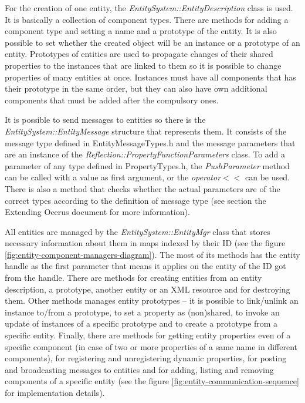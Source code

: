 \documentclass[a4paper, 12pt]{report}
\begin{document}
For the creation of one entity, the \emph{EntitySystem::EntityDescription} class is used. It is basically a collection of component types. There are methods for adding a component type and setting a name and a prototype of the entity. It is also possible to set whether the created object will be an instance or a prototype of an entity. Prototypes of entities are used to propagate changes of their shared properties to the instances that are linked to them so it is possible to change properties of many entities at once. Instances must have all components that has their prototype in the same order, but they can also have own additional components that must be added after the compulsory ones.

It is possible to send messages to entities so there is the \emph{EntitySystem::EntityMessage} structure that represents them. It consists of the message type defined in EntityMessageTypes.h and the message parameters that are an instance of the \emph{Reflection::PropertyFunctionParameters} class. To add a parameter of any type defined in PropertyTypes.h, the \emph{PushParameter} method can be called with a value as first argument, or the \emph{operator}$<<$ can be used. There is also a method that checks whether the actual parameters are of the correct types according to the definition of message type (see section the Extending Ocerus document for more information).

All entities are managed by the \emph{EntitySystem::EntityMgr} class that stores necessary information about them in maps indexed by their ID (see the figure \ref{fig:entity-component-managers-diagram}). The most of its methods has the entity handle as the first parameter that means it applies on the entity of the ID got from the handle. There are methods for creating entities from an entity description, a prototype, another entity or an XML resource and for destroying them. Other methods manages entity prototypes -- it is possible to link/unlink an instance to/from a prototype, to set a property as (non)shared, to invoke an update of instances of a specific prototype and to create a prototype from a specific entity. Finally, there are methods for getting entity properties even of a specific component (in case of two or more properties of a same name in different components), for registering and unregistering dynamic properties, for posting and broadcasting messages to entities and for adding, listing and removing components of a specific entity (see the figure \ref{fig:entity-communication-sequence} for implementation details).
\end{document}

